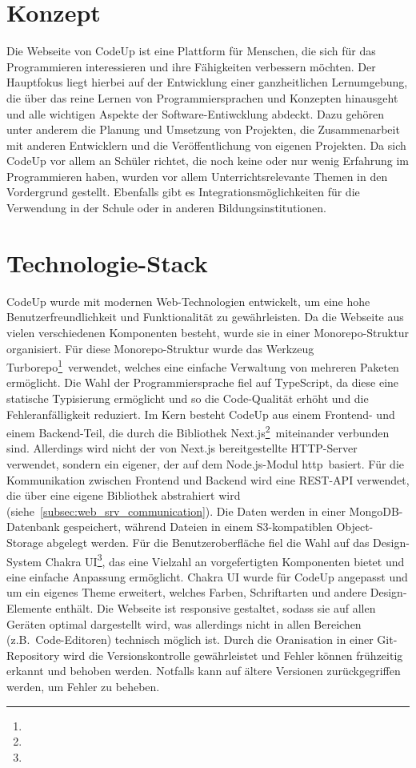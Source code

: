 \documentclass[main.tex]{subfiles}
\begin{document}
    \section{Konzept}
    Die Webseite von CodeUp ist eine Plattform für Menschen, die sich für das Programmieren interessieren und ihre Fähigkeiten verbessern möchten.
    Der Hauptfokus liegt hierbei auf der Entwicklung einer ganzheitlichen Lernumgebung, die über das reine Lernen von Programmiersprachen und Konzepten hinausgeht und alle wichtigen Aspekte der Software-Entiwcklung abdeckt.
    Dazu gehören unter anderem die Planung und Umsetzung von Projekten, die Zusammenarbeit mit anderen Entwicklern und die Veröffentlichung von eigenen Projekten.
    Da sich CodeUp vor allem an Schüler richtet, die noch keine oder nur wenig Erfahrung im Programmieren haben, wurden vor allem Unterrichtsrelevante Themen in den Vordergrund gestellt.
    Ebenfalls gibt es Integrationsmöglichkeiten für die Verwendung in der Schule oder in anderen Bildungsinstitutionen.

    \section{Technologie-Stack}
    CodeUp wurde mit modernen Web-Technologien entwickelt, um eine hohe Benutzerfreundlichkeit und Funktionalität zu gewährleisten.
    Da die Webseite aus vielen verschiedenen Komponenten besteht, wurde sie in einer Monorepo-Struktur organisiert.
    Für diese Monorepo-Struktur wurde das Werkzeug \dq Turborepo\dq\footnote{}\ verwendet, welches eine einfache Verwaltung von mehreren Paketen ermöglicht.
    Die Wahl der Programmiersprache fiel auf TypeScript, da diese eine statische Typisierung ermöglicht und so die Code-Qualität erhöht und die Fehleranfälligkeit reduziert.
    Im Kern besteht CodeUp aus einem Frontend- und einem Backend-Teil, die durch die Bibliothek \dq Next.js\dq\footnote{}\ miteinander verbunden sind.
    Allerdings wird nicht der von Next.js bereitgestellte HTTP-Server verwendet, sondern ein eigener, der auf dem Node.js-Modul \dq http\dq\ basiert.
    Für die Kommunikation zwischen Frontend und Backend wird eine REST-API verwendet, die über eine eigene Bibliothek abstrahiert wird (siehe~\ref{subsec:web_srv_communication}).
    Die Daten werden in einer MongoDB-Datenbank gespeichert, während Dateien in einem S3-kompatiblen Object-Storage abgelegt werden.
    Für die Benutzeroberfläche fiel die Wahl auf das Design-System \dq Chakra UI\dq\footnote{}, das eine Vielzahl an vorgefertigten Komponenten bietet und eine einfache Anpassung ermöglicht.
    Chakra UI wurde für CodeUp angepasst und um ein eigenes Theme erweitert, welches Farben, Schriftarten und andere Design-Elemente enthält.
    Die Webseite ist responsive gestaltet, sodass sie auf allen Geräten optimal dargestellt wird, was allerdings nicht in allen Bereichen (z.B.~Code-Editoren) technisch möglich ist.
    Durch die Oranisation in einer Git-Repository wird die Versionskontrolle gewährleistet und Fehler können frühzeitig erkannt und behoben werden.
    Notfalls kann auf ältere Versionen zurückgegriffen werden, um Fehler zu beheben.
\end{document}
